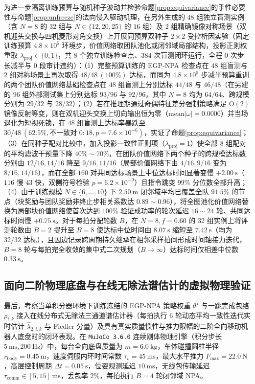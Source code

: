为进一步隔离训练预算与随机种子波动并检验命题\ref{prop:equivariance}的手性必要性与命题\ref{prop:unfreeze}的法向侵入驱动机理，在另外生成的 $48$ 组独立盲测实例（含 $N=8$ 的 $32$ 组与 $N\in\{12,20,25\}$ 的 $16$ 组）及 $2$ 组精确镜像对称场景（双机迎头交换与四机菱形对角交换）上开展同预算双种子 $2\times 2$ 受控析因实验（固定训练预算 $4.8\times 10^5$ 环境步，价值网络取团队池化或闭邻域局部结构，投影正则权重取 $\lambda_{\mathrm{proj}}\in\{0,1\}$，共 $8$ 个独立训练检查点、$384$ 次盲测闭环运行，全程 $0$ 次步长减半与 $0$ 段审计违约）：（1）完整预算训练的 EGP-NPA 检查点在 $48$ 组盲测与 $2$ 组对称场景上再次取得 $48/48\ (100\%)$ 达标，而同为 $4.8\times 10^5$ 步减半预算重训的两个团队价值网络基础检查点在 $48$ 组盲测上分别达标 $44/48$ 与 $46/48$（在另建的 $96$ 组外部测试集上分别达标 $93/96$ 与 $92/96$，其中 $N=8$ 均为 $64/64$、跨规模分别为 $29/32$ 与 $28/32$）；（2）若在推理期通过奇偶特征差分强制策略满足 $\mathrm{O}(2)$ 镜像反射等变，则在双机迎头交换上切向输出恒为零（$\mathrm{mean}|\omega|=0.0000$）并当场退化为短视死锁，在 $48$ 组盲测上达标率暴跌至 $30/48\ (62.5\%,\text{不一致对 }0:18,p=7.6\times 10^{-6})$，实证了命题\ref{prop:equivariance}；（3）在同种子配对比较中，加入投影一致性正则项（$\lambda_{\mathrm{proj}}=1$）使全部 $8$ 组配对的平均滤波干预量下降 $40\%\sim 70\%$，在团队价值网络下两个种子的跨规模达标数分别由 $12/16,14/16$ 降至 $9/16,11/16$（局部价值网络下由 $4/16,9/16$ 变为 $8/16,14/16$），而在全部 $160$ 对共同达标场景上中位达标时间显著变慢 $+2.00\ \mathrm s$（$116$ 慢 $43$ 快，双侧符号检验 $p=6.2\times 10^{-9}$）且指令跳变 $99\%$ 分位数全部升高；（4）由于训练规模 $N\in\{6,\dots,10\}$ 下 $2.50\ \mathrm m$ 闭邻域平均已覆盖全队 $91.5\%$ 的节点（块奖励与团队奖励非终止步相关系数达 $0.89\sim 0.96$），将全图池化价值网络替换为局部块价值网络使首次达到 $100\%$ 验证成功率的轮次延迟 $16\sim 24$ 轮、共同达标时间慢 $+0.75\ \mathrm s$。对于每拍分配轮数 $B$，在 $N=8,f=0.60$ 的 $32$ 组实例上将评测轮数由 $B=2$ 提升至 $B=8$ 使达标中位时间由 $8.07\ \mathrm s$ 缩短至 $7.42\ \mathrm s$（均为 $32/32$ 达标），且因边记录跨周期持久继承在相邻采样拍间形成时间轴接力迭代，$B=8$ 轮与每拍完全收敛的集中式二次规划（$B\to\infty$）达标时间仅相差中位数 $0.33\ \mathrm s$。

\subsection{面向二阶物理底盘与在线无除法谱估计的虚拟物理验证}\label{subsec:mujoco}
最后，考察当单积分器环境下训练冻结的 EGP-NPA 策略权重 $\theta^\star$ 与一跳完成包络 $\rho_{i,k}$ 接入在线分布式无除法三通道谱估计器（每拍执行 $6$ 轮动态平均一致性迭代实时估计 $\hat\lambda_{2,i,k}$ 与 Fiedler 分量）及具有真实质量惯性与推力限幅的二阶全向移动机器人底盘时的闭环表现。在 \texttt{MuJoCo 3.6.0} 连续刚体物理引擎（积分步长 $5\ \mathrm{ms},200\ \mathrm{Hz}$）中，每台全向底盘质量为 $m=6.0\ \mathrm{kg}$，车体碰撞圆柱半径 $r_{\mathrm{body}}=0.45\ \mathrm m$，速度伺服内环时间常数 $\tau_v=45\ \mathrm{ms}$，最大水平推力 $F_{\max}=22.0\ \mathrm N$，高层控制周期 $\Delta t=0.05\ \mathrm s$，位姿观测延迟 $10\ \mathrm{ms}$，无线包传输延迟 $\tau_{\mathrm{comm}}\in[5,15]\ \mathrm{ms}$，丢包率 $2\%$，每拍执行 $B=4$ 轮闭邻域 NPA。

